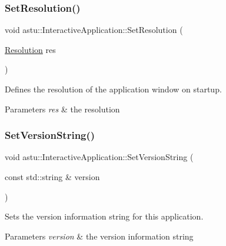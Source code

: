\subsubsection{\texorpdfstring{Set\+Resolution()}{SetResolution()}}
{\footnotesize\ttfamily void astu\+::\+Interactive\+Application\+::\+Set\+Resolution (\begin{DoxyParamCaption}\item[{\hyperlink{group__srv__group_ga68a91c7015964dbdea802829ae5ccb3c}{Resolution}}]{res }\end{DoxyParamCaption})}

Defines the resolution of the application window on startup.


\begin{DoxyParams}{Parameters}
{\em res} & the resolution \\
\hline
\end{DoxyParams}
\mbox{\label{classastu_1_1InteractiveApplication_af5a90bd3cf0ec6c81ffe886ae30b397a}} 
\subsubsection{\texorpdfstring{Set\+Version\+String()}{SetVersionString()}}
{\footnotesize\ttfamily void astu\+::\+Interactive\+Application\+::\+Set\+Version\+String (\begin{DoxyParamCaption}\item[{const std\+::string \&}]{version }\end{DoxyParamCaption})}

Sets the version information string for this application.


\begin{DoxyParams}{Parameters}
{\em version} & the version information string \\
\hline
\end{DoxyParams}
\mbox{\label{classastu_1_1InteractiveApplication_aead5e69def1c1152a6cd1bce96e74077}} 

